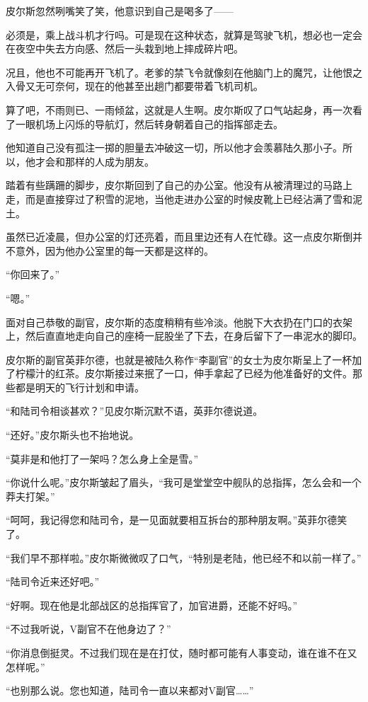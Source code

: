 皮尔斯忽然咧嘴笑了笑，他意识到自己是喝多了——

必须是，乘上战斗机才行吗。可是现在这种状态，就算是驾驶飞机，想必也一定会在夜空中失去方向感、然后一头栽到地上摔成碎片吧。

况且，他也不可能再开飞机了。老爹的禁飞令就像刻在他脑门上的魔咒，让他恨之入骨又无可奈何，现在的他甚至出趟门都要带着飞机司机。

算了吧，不雨则已、一雨倾盆，这就是人生啊。皮尔斯叹了口气站起身，再一次看了一眼机场上闪烁的导航灯，然后转身朝着自己的指挥部走去。

他知道自己没有孤注一掷的胆量去冲破这一切，所以他才会羡慕陆久那小子。所以，他才会和那样的人成为朋友。

踏着有些蹒跚的脚步，皮尔斯回到了自己的办公室。他没有从被清理过的马路上走，而是直接穿过了积雪的泥地，当他走进办公室的时候皮靴上已经沾满了雪和泥土。

虽然已近凌晨，但办公室的灯还亮着，而且里边还有人在忙碌。这一点皮尔斯倒并不意外，因为他办公室里的每一天都是这样的。

“你回来了。”

“嗯。”

面对自己恭敬的副官，皮尔斯的态度稍稍有些冷淡。他脱下大衣扔在门口的衣架上，然后直直地走向自己的座椅一屁股坐了下去，在身后留下了一串泥水的脚印。

皮尔斯的副官英菲尔德，也就是被陆久称作“李副官”的女士为皮尔斯呈上了一杯加了柠檬汁的红茶。皮尔斯接过来抿了一口，伸手拿起了已经为他准备好的文件。那些都是明天的飞行计划和申请。

“和陆司令相谈甚欢？”见皮尔斯沉默不语，英菲尔德说道。

“还好。”皮尔斯头也不抬地说。

“莫非是和他打了一架吗？怎么身上全是雪。”

“你说什么呢。”皮尔斯皱起了眉头，“我可是堂堂空中舰队的总指挥，怎么会和一个莽夫打架。”

“呵呵，我记得您和陆司令，是一见面就要相互拆台的那种朋友啊。”英菲尔德笑了。

“我们早不那样啦。”皮尔斯微微叹了口气，“特别是老陆，他已经不和以前一样了。”

“陆司令近来还好吧。”

“好啊。现在他是北部战区的总指挥官了，加官进爵，还能不好吗。”

“不过我听说，V副官不在他身边了？”

“你消息倒挺灵。不过我们现在是在打仗，随时都可能有人事变动，谁在谁不在又怎样呢。”

“也别那么说。您也知道，陆司令一直以来都对V副官……”

